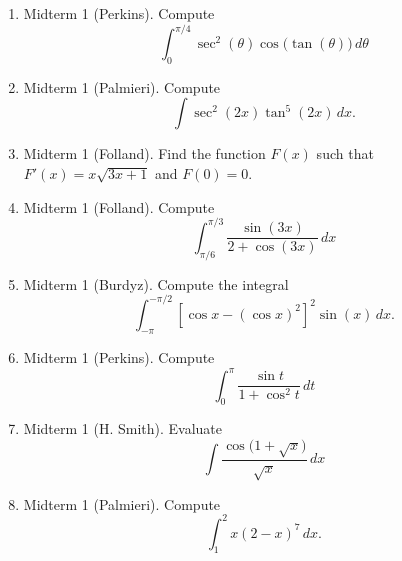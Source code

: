 \documentclass[11pt]{article}
\begin{document}

\begin{enumerate}
\item Midterm 1 (Perkins). Compute
\[\int_0^{\pi/4} \sec^2(\theta) \cos \big (\tan (\theta) \big ) \, d\theta\]

\vspace{8cm}

\item Midterm 1 (Palmieri). Compute
\[\int \sec^2(2x) \tan^5(2x) \, dx. \]

\newpage
\item Midterm 1 (Folland). Find the function $F(x)$ such that $F'(x) =
  x \sqrt{3x+1}$ and $F(0) = 0$. 

\vspace{8cm}

\item Midterm 1 (Folland). Compute
\[\int_{\pi/6}^{\pi/3} \frac{\sin(3x)}{2 + \cos(3x)} \, dx\]

\newpage

\item Midterm 1 (Burdyz). Compute the integral
\[\int_{-\pi}^{-\pi/2} [\cos x - (\cos x )^2]^2 \sin(x) \, dx.\]

\vspace{8cm}

\item Midterm 1 (Perkins). Compute
\[\int_0^{\pi} \frac{\sin t}{1+\cos^2 t} \, dt\]

\vspace{8cm}

\newpage
\item Midterm 1 (H. Smith). Evaluate
\[\int \frac{\cos\big (1+\sqrt{x} \big )}{\sqrt{x}} \, dx\]

\vspace{8cm}

\item Midterm 1 (Palmieri). Compute
\[\int_1^2 x(2-x)^7 \, dx.\]
\end{enumerate}
\end{document}
